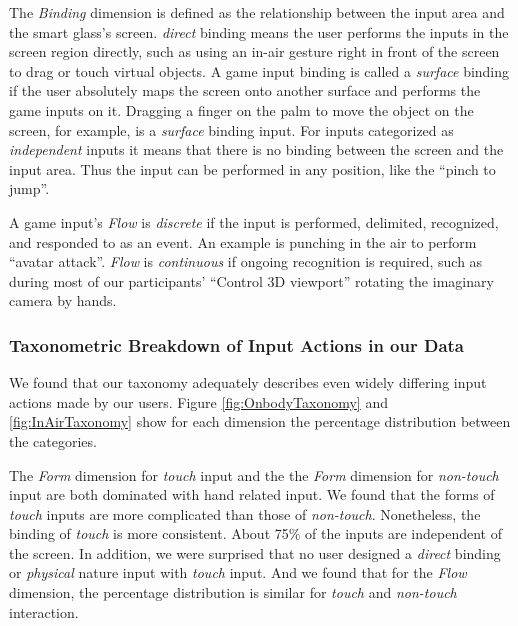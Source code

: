 \documentclass{sigchi}
\begin{document}
The \emph{Binding} dimension is defined as the relationship between the input area and the smart glass's screen. \emph{direct} binding means the user performs the inputs in the screen region directly, such as using an in-air gesture right in front of the screen to drag or touch virtual objects. A game input binding is called a \emph{surface} binding if the user absolutely maps the screen onto another surface and performs the game inputs on it. Dragging a finger on the palm to move the object on the screen, for example, is a \emph{surface} binding input. For inputs categorized as \emph{independent} inputs it means that there is no binding between the screen and the input area. Thus the input can be performed in any position, like the ``pinch to jump''.

  A game input's \emph{Flow} is \emph{discrete} if the input is performed, delimited, recognized, and responded to as an event. An example is punching in the air to perform ``avatar attack''. \emph{Flow} is \emph{continuous} if ongoing recognition is required, such as during most of our participants' ``Control 3D viewport'' rotating the imaginary camera by hands. 
 

 \subsubsection{Taxonometric Breakdown of Input Actions in our Data}
We found that our taxonomy adequately describes even widely differing input actions made by our users. Figure \ref{fig:OnbodyTaxonomy} and \ref{fig:InAirTaxonomy} show for each dimension the percentage distribution between the categories.

The \emph{Form} dimension for \emph{touch} input and the the \emph{Form} dimension for \emph{non-touch} input are both dominated with hand related input. We found that the forms of \emph{touch} inputs are more complicated than those of \emph{non-touch}. Nonetheless, the binding of \emph{touch} is more consistent. About 75\% of the inputs are independent of the screen. In addition, we were surprised that no user designed a \emph{direct} binding or \emph{physical} nature input with \emph{touch} input. And we found that for the \emph{Flow} dimension, the percentage distribution is similar for \emph{touch} and \emph{non-touch} interaction.
\end{document}
